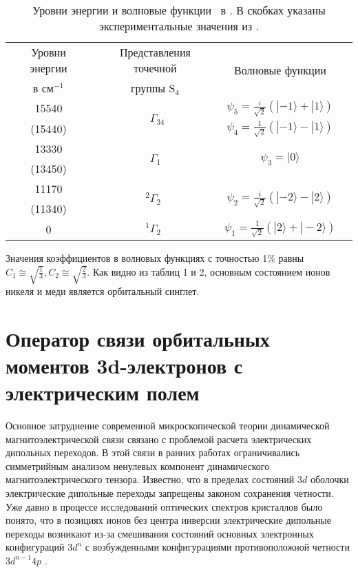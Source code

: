 \begin{table} [htbp]%
	\centering
	\begin{threeparttable}%
		\caption{Уровни энергии и волновые функции \cu\ в \cbo. В скобках указаны экспериментальные значения из \cite{Pisarev2011}.}%
		\label{tab:CuEnAndWf}%
		\begin{SingleSpace}
			\begin{tabular}{| c | c | c | c |}
				\hline 
				Уровни энергии & Представления точечной & \multirow{2}{*}{Волновые функции} \\ 
				в см$^{-1}$ & группы $\mathrm{S}_{4}$ &  \\ 
				\hline 
				15540 & \multirow{2}{*}{$\phantom{{ }^{2} }\Gamma_{34}$} & $\psi_{5}=\frac{i}{\sqrt{2}}(|-1\rangle+|1\rangle)$ \\
				(15440) & & $\psi_{4}=\frac{1}{\sqrt{2}}(|-1\rangle-|1\rangle)$ \\
				\hline
				13330 & \multirow{2}{*}{$\phantom{{ }^{2} }\Gamma_{1\phantom{4}}$} & \multirow{2}{*}{$\psi_{3}=|0\rangle$} \\
				(13450) & & \\
				\hline
				11170 & \multirow{2}{*}{${ }^{2} \Gamma_{2\phantom{4}}$} & \multirow{2}{*}{$\psi_{2}=\frac{i}{\sqrt{2}}(|-2\rangle-|2\rangle)$} \\
				(11340) & & \\
				\hline
				0 & ${ }^{1} \Gamma_{2\phantom{4}}$ & $\psi_{1}=\frac{1}{\sqrt{2}}(|2\rangle+|-2\rangle)$ \\
				\hline
			\end{tabular}%
		\end{SingleSpace}
	\end{threeparttable}
\end{table}

Значения коэффициентов в волновых функциях с точностью 1\% равны $C_{1}\cong\sqrt{\frac{1}{3}}, C_{2}\cong\sqrt{\frac{2}{3}}$. Как видно из таблиц 1 и 2, основным состоянием ионов никеля и меди является орбитальный синглет.

\section{Оператор связи орбитальных моментов 3d-электронов с электрическим полем}\label{sec:ch2/sec2}

Основное затруднение современной микроскопической теории динамической магнитоэлектрической связи связано с проблемой расчета электрических дипольных переходов. В этой связи в ранних работах \cite{Lovesey2009, Miyahara2012, Miyahara2014, Kezsmarki2014} ограничивались симметрийным анализом ненулевых компонент динамического магнитоэлектрического тензора. Известно, что в пределах состояний $3d$ оболочки электрические дипольные переходы запрещены законом сохранения четности. Уже давно в процессе исследований оптических спектров кристаллов было понято, что в позициях ионов без центра инверсии электрические дипольные переходы возникают из-за смешивания состояний основных электронных конфигураций $3d^n$ с возбужденными конфигурациями противоположной четности $3d^{n-1}4p$ \cite{Low1960}.

